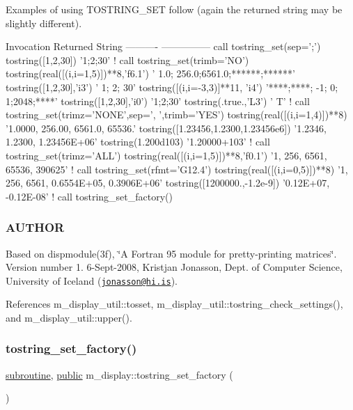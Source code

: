 Examples of using T\+O\+S\+T\+R\+I\+N\+G\+\_\+\+S\+ET follow (again the returned string may be slightly different). \begin{DoxyVerb}  Invocation                              Returned String
  ----------                              ---------------
  call tostring_set(sep=';')
  tostring([1,2,30])                      '1;2;30'
  !
  call tostring_set(trimb='NO')
  tostring(real([(i,i=1,5)])**8,'f6.1')   '   1.0; 256.0;6561.0;******;******'
  tostring([1,2,30],'i3')                 '  1;  2; 30'
  tostring([(i,i=-3,3)]**11, 'i4')        '****;****;  -1;   0;   1;2048;****'
  tostring([1,2,30],'i0')                 '1;2;30'
  tostring(.true.,'L3')                   '  T'
  !
  call tostring_set(trimz='NONE',sep=', ',trimb='YES')
  tostring(real([(i,i=1,4)])**8)          '1.0000, 256.00, 6561.0, 65536.'
  tostring([1.23456,1.2300,1.23456e6])    '1.2346, 1.2300, 1.23456E+06'
  tostring(1.200d103)                     '1.20000+103'
  !
  call tostring_set(trimz='ALL')
  tostring(real([(i,i=1,5)])**8,'f0.1')   '1, 256, 6561, 65536, 390625'
  !
  call tostring_set(rfmt='G12.4')
  tostring(real([(i,i=0,5)])**8)          '1, 256, 6561, 0.6554E+05, 0.3906E+06'
  tostring([1200000.,-1.2e-9])            '0.12E+07, -0.12E-08'
  !
  call tostring_set_factory()
\end{DoxyVerb}


\subsubsection*{A\+U\+T\+H\+OR}

Based on dispmodule(3f), \char`\"{}\+A Fortran 95 module for pretty-\/printing matrices\char`\"{}. Version number 1. 6-\/\+Sept-\/2008, Kristjan Jonasson, Dept. of Computer Science, University of Iceland (\href{mailto:jonasson@hi.is}{\tt jonasson@hi.\+is}). 

References m\+\_\+display\+\_\+util\+::tosset, m\+\_\+display\+\_\+util\+::tostring\+\_\+check\+\_\+settings(), and m\+\_\+display\+\_\+util\+::upper().

\mbox{\label{namespacem__display_abf51a5db397d27e0c6cb39e9f3fa7e24}} 
\subsubsection{\texorpdfstring{tostring\+\_\+set\+\_\+factory()}{tostring\_set\_factory()}}
{\footnotesize\ttfamily \hyperlink{M__stopwatch_83_8txt_acfbcff50169d691ff02d4a123ed70482}{subroutine}, \hyperlink{M__stopwatch_83_8txt_a2f74811300c361e53b430611a7d1769f}{public} m\+\_\+display\+::tostring\+\_\+set\+\_\+factory (\begin{DoxyParamCaption}{ }\end{DoxyParamCaption})}



